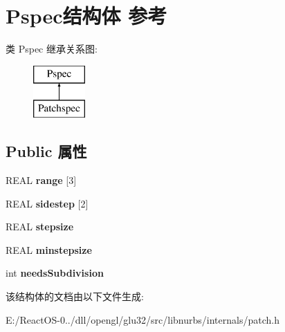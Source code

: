 \hypertarget{struct_pspec}{}\section{Pspec结构体 参考}
\label{struct_pspec}
类 Pspec 继承关系图\+:\begin{figure}[H]
\begin{center}
\leavevmode
\includegraphics[height=2.000000cm]{struct_pspec}
\end{center}
\end{figure}
\subsection*{Public 属性}
\begin{DoxyCompactItemize}
\item 
\mbox{\label{struct_pspec_a47c63dd0cb3064f9c692c051e52e7b28}} 
R\+E\+AL {\bfseries range} \mbox{[}3\mbox{]}
\item 
\mbox{\label{struct_pspec_a0d777ff5a54d393abdff1789b828e63e}} 
R\+E\+AL {\bfseries sidestep} \mbox{[}2\mbox{]}
\item 
\mbox{\label{struct_pspec_a6ee80c3e0e5cc950fd9dae6bcb53f8a9}} 
R\+E\+AL {\bfseries stepsize}
\item 
\mbox{\label{struct_pspec_ae5a1e2caef95619d268fa4be6cf57792}} 
R\+E\+AL {\bfseries minstepsize}
\item 
\mbox{\label{struct_pspec_a25d9d981b05838c877b7c6417c3b624f}} 
int {\bfseries needs\+Subdivision}
\end{DoxyCompactItemize}


该结构体的文档由以下文件生成\+:\begin{DoxyCompactItemize}
\item 
E\+:/\+React\+O\+S-\/0../dll/opengl/glu32/src/libnurbs/internals/patch.\+h\end{DoxyCompactItemize}
